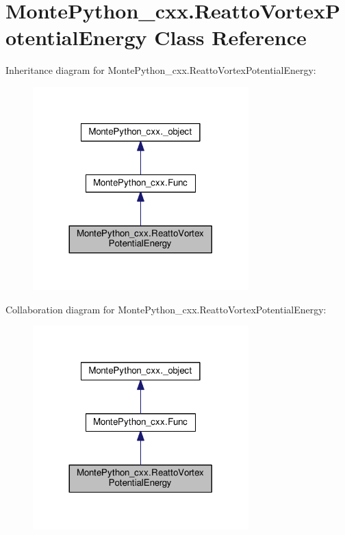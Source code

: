 \hypertarget{classMontePython__cxx_1_1ReattoVortexPotentialEnergy}{}\section{Monte\+Python\+\_\+cxx.\+Reatto\+Vortex\+Potential\+Energy Class Reference}
\label{classMontePython__cxx_1_1ReattoVortexPotentialEnergy}


Inheritance diagram for Monte\+Python\+\_\+cxx.\+Reatto\+Vortex\+Potential\+Energy\+:
\nopagebreak
\begin{figure}[H]
\begin{center}
\leavevmode
\includegraphics[width=236pt]{classMontePython__cxx_1_1ReattoVortexPotentialEnergy__inherit__graph}
\end{center}
\end{figure}


Collaboration diagram for Monte\+Python\+\_\+cxx.\+Reatto\+Vortex\+Potential\+Energy\+:
\nopagebreak
\begin{figure}[H]
\begin{center}
\leavevmode
\includegraphics[width=236pt]{classMontePython__cxx_1_1ReattoVortexPotentialEnergy__coll__graph}
\end{center}
\end{figure}
